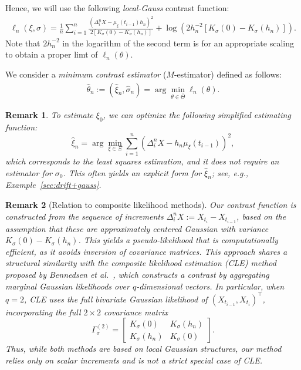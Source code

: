 \documentclass[a4paper,10pt,twoside]{article}
\newtheorem{remark}{Remark}[section]
\numberwithin{equation}{section}
\def\D{\Delta}
\def\l{\left}
\def\r{\right}
\def\th{\theta}
\def\s{\sigma}
\def\wh#1{\widehat{#1}}
\def\ol#1{\overline{#1}}
\begin{document}
Hence, we will use the following {\it local-Gauss} contrast function:
\begin{align}
\ell_n(\xi,\s)  = \frac{1}{n}\sum_{i=1}^n \frac{\l(\D_i^n X - \mu_\xi(t_{i-1}) h_n\r)^2}{2[K_{\s}(0) - K_{\s}(h_n)]} +  \log \l(2h_n^{-2}[K_{\s}(0) - K_{\s}(h_n)]\r). \label{lg-contrast}
\end{align}
Note that $2h_n^{-2}$ in the logarithm of the second term is for an appropriate scaling to obtain a proper limt of $\ell_n(\th)$. 
 
We consider a {\it minimum contrast estimator} ($M$-estimator) defined as follows:
\begin{align*}
\wh{\th}_n := (\wh{\xi}_n,\wh{\s}_n)= \arg\min_{\th \in \ol{\Theta}} \ell_n(\th). 
\end{align*}


\begin{remark}\label{rem:xi}
To estimate $\xi_0$, we can optimize the following simplified estimating function:
\[
\wh{\xi}_n=\arg\min_{\xi\in \Xi} \sum_{i=1}^n \l( \Delta_i^n X - h_n \mu_\xi(t_{i-1}) \r)^2,
\]
which corresponds to the least squares estimation, and it does not require an estimator for $\sigma_0$. 
This often yields an explicit form for $\widehat{\xi}_n$; see, e.g., Example~\ref{sec:drift+gauss}.
\end{remark}


\begin{remark}[Relation to composite likelihood methods]
Our contrast function is constructed from the sequence of increments $\D_i^n X := X_{t_i} - X_{t_{i-1}}$, based on the assumption that these are approximately centered Gaussian with variance $K_\sigma(0) - K_\sigma(h_n)$. This yields a pseudo-likelihood that is computationally efficient, as it avoids inversion of covariance matrices.
This approach shares a structural similarity with the composite likelihood estimation (CLE) method proposed by Bennedsen et al.~\cite{betal24}, which constructs a contrast by aggregating marginal Gaussian likelihoods over $q$-dimensional vectors. In particular, when $q = 2$, CLE uses the full bivariate Gaussian likelihood of $(X_{t_{i-1}}, X_{t_i})^\top$, incorporating the full $2 \times 2$ covariance matrix
\[
\Gamma_\sigma^{(2)} =
\begin{bmatrix}
K_\sigma(0) & K_\sigma(h_n) \\
K_\sigma(h_n) & K_\sigma(0)
\end{bmatrix}.
\]
Thus, while both methods are based on local Gaussian structures, our method relies only on scalar increments and is not a strict special case of CLE.
\end{remark}
\end{document}
